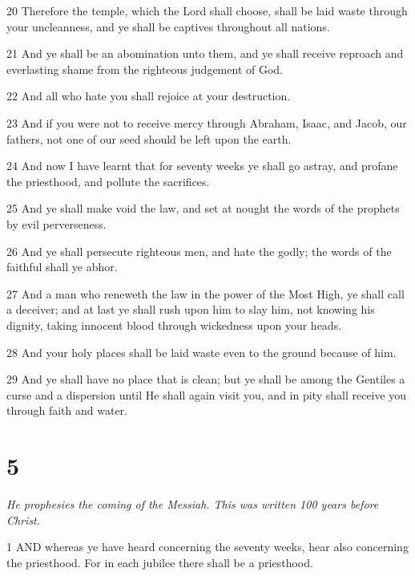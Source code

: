 \par 20 Therefore the temple, which the Lord shall choose, shall be laid waste through your uncleanness, and ye shall be captives throughout all nations.

\par 21 And ye shall be an abomination unto them, and ye shall receive reproach and everlasting shame from the righteous judgement of God.

\par 22 And all who hate you shall rejoice at your destruction.

\par 23 And if you were not to receive mercy through Abraham, Isaac, and Jacob, our fathers, not one of our seed should be left upon the earth.

\par 24 And now I have learnt that for seventy weeks ye shall go astray, and profane the priesthood, and pollute the sacrifices.

\par 25 And ye shall make void the law, and set at nought the words of the prophets by evil perverseness.

\par 26 And ye shall persecute righteous men, and hate the godly; the words of the faithful shall ye abhor.

\par 27 And a man who reneweth the law in the power of the Most High, ye shall call a deceiver; and at last ye shall rush upon him to slay him, not knowing his dignity, taking innocent blood through wickedness upon your heads.

\par 28 And your holy places shall be laid waste even to the ground because of him.

\par 29 And ye shall have no place that is clean; but ye shall be among the Gentiles a curse and a dispersion until He shall again visit you, and in pity shall receive you through faith and water.

\chapter{5}

\par \textit{He prophesies the coming of the Messiah. This was written 100 years before Christ.}

\par 1 AND whereas ye have heard concerning the seventy weeks, hear also concerning the priesthood. For in each jubilee there shall be a priesthood.

